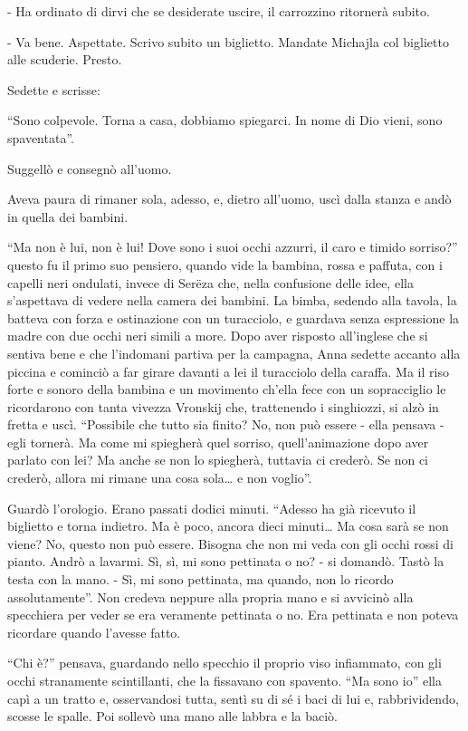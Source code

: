 - Ha ordinato di dirvi che se desiderate uscire, il carrozzino ritornerà subito. 

- Va bene. Aspettate. Scrivo subito un biglietto. Mandate Michajla col biglietto alle scuderie. Presto. 

Sedette e scrisse: 

``Sono colpevole. Torna a casa, dobbiamo spiegarci. In nome di Dio vieni, sono spaventata''. 

Suggellò e consegnò all'uomo. 

Aveva paura di rimaner sola, adesso, e, dietro all'uomo, uscì dalla stanza e andò in quella dei bambini. 

``Ma non è lui, non è lui! Dove sono i suoi occhi azzurri, il caro e timido sorriso?'' questo fu il primo suo pensiero, quando vide la bambina, rossa e paffuta, con i capelli neri ondulati, invece di Serëza che, nella confusione delle idee, ella s'aspettava di vedere nella camera dei bambini. La bimba, sedendo alla tavola, la batteva con forza e ostinazione con un turacciolo, e guardava senza espressione la madre con due occhi neri simili a more. Dopo aver risposto all'inglese che si sentiva bene e che l'indomani partiva per la campagna, Anna sedette accanto alla piccina e cominciò a far girare davanti a lei il turacciolo della caraffa. Ma il riso forte e sonoro della bambina e un movimento ch'ella fece con un sopracciglio le ricordarono con tanta vivezza Vronskij che, trattenendo i singhiozzi, si alzò in fretta e uscì. ``Possibile che tutto sia finito? No, non può essere - ella pensava - egli tornerà. Ma come mi spiegherà quel sorriso, quell'animazione dopo aver parlato con lei? Ma anche se non lo spiegherà, tuttavia ci crederò. Se non ci crederò, allora mi rimane una cosa sola\ldots{} e non voglio''. 

Guardò l'orologio. Erano passati dodici minuti. ``Adesso ha già ricevuto il biglietto e torna indietro. Ma è poco, ancora dieci minuti\ldots{} Ma cosa sarà se non viene? No, questo non può essere. Bisogna che non mi veda con gli occhi rossi di pianto. Andrò a lavarmi. Sì, sì, mi sono pettinata o no? - si domandò. Tastò la testa con la mano. - Sì, mi sono pettinata, ma quando, non lo ricordo assolutamente''. Non credeva neppure alla propria mano e si avvicinò alla specchiera per veder se era veramente pettinata o no. Era pettinata e non poteva ricordare quando l'avesse fatto. 

``Chi è?'' pensava, guardando nello specchio il proprio viso infiammato, con gli occhi stranamente scintillanti, che la fissavano con spavento. ``Ma sono io'' ella capì a un tratto e, osservandosi tutta, sentì su di sé i baci di lui e, rabbrividendo, scosse le spalle. Poi sollevò una mano alle labbra e la baciò. 

